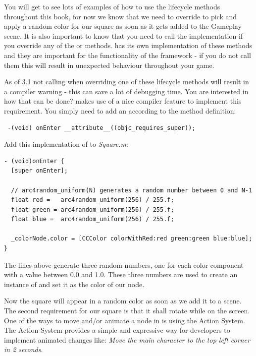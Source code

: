 You will get to see lots of examples of how to use the lifecycle methods
throughout this book, for now we know that we need to override
 to pick and apply a random color for our square as soon as
it gets added to the Gameplay scene. It is also important to know that you need
to call the  implementation if you override any of the 
 or  methods. \ccnode{}
has its own implementation of these methods and they are important for the
functionality of the framework - if you do not call them this will result in
unexpected behaviour throughout your game. 
\begin{details}[frametitle={Overriding \cocos{} lifecycle methods}]
As of \cocos{} 3.1 not calling  when overriding one of these
lifecycle methods will result in a compiler warning - this can save a lot of
debugging time. You are interested in how that can be done? \cocos{} makes use
of a nice compiler feature to implement this requirement. You simply need to
add an according  to the method definition:

\begin{lstlisting}
 -(void) onEnter __attribute__((objc_requires_super));
\end{lstlisting}

\end{details}
Add this implementation of
 to \textit{Square.m}:
\begin{lstlisting}
- (void)onEnter {
  [super onEnter];
  
  // arc4random_uniform(N) generates a random number between 0 and N-1
  float red =   arc4random_uniform(256) / 255.f;
  float green = arc4random_uniform(256) / 255.f;
  float blue =  arc4random_uniform(256) / 255.f;
  
  _colorNode.color = [CCColor colorWithRed:red green:green blue:blue];
}
\end{lstlisting}
The lines above generate three random numbers, one for each color component
with a value between 0.0 and 1.0. These three numbers are used to create an
instance of  and set it as the color of our node. 

Now the square will appear in a random color as soon as we add it to a scene.
The second requirement for our square is that it shall rotate while on the
screen. One of the ways to move and/or animate a node in \cocos{} is using the
\cocos{} Action System. The Action System provides a simple
and expressive way for developers to implement animated changes like:
\textit{Move the main character to the top left corner in 2 seconds}. 


